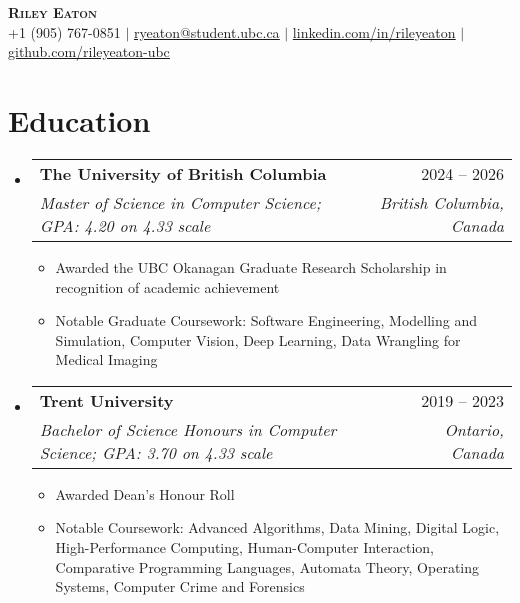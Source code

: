 \documentclass[letterpaper,11.5pt]{article}
\makeatletter
\newcommand{\resumeItem}[1]{
  \item\small{
    {#1 \vspace{-2pt}}
  }
}
\newcommand{\resumeSubheading}[4]{
  \vspace{-2pt}\item
    \begin{tabular*}{0.97\textwidth}[t]{l@{\extracolsep{\fill}}r}
      \textbf{#1} & #2 \\
      \textit{\small#3} & \textit{\small #4} \\
    \end{tabular*}\vspace{-7pt}
}
\newcommand{\resumeSubHeadingListStart}{\begin{itemize}[leftmargin=0.15in, label={}]}
\newcommand{\resumeSubHeadingListEnd}{\end{itemize}}
\newcommand{\resumeItemListStart}{\begin{itemize}}
\newcommand{\resumeItemListEnd}{\end{itemize}\vspace{-5pt}}
\def\iconSpace{0.5pt}
\makeatother
\begin{document}
\begin{center}
    \textbf{\Huge \scshape Riley Eaton} \\ \vspace{1pt}
    \small \faMobile \hspace{\iconSpace} +1 (905) 767-0851 
    $|$ \faEnvelope \hspace{\iconSpace} \href{mailto:ryeaton@student.ubc.ca}{\underline{ryeaton@student.ubc.ca}} 
    $|$ \faLinkedinSquare \hspace{\iconSpace} \href{https://linkedin.com/in/rileyeaton}{\underline{linkedin.com/in/rileyeaton}} 
    $|$ \faGithub \hspace{\iconSpace} \href{https://github.com/rileyeaton-ubc}{\underline{github.com/rileyeaton-ubc}}
\end{center}

\section{Education}
  \resumeSubHeadingListStart
    \resumeSubheading
      {The University of British Columbia}{2024 -- 2026}
      {Master of Science in Computer Science; GPA: 4.20 on 4.33 scale}{British Columbia, Canada}
      \resumeItemListStart
        \resumeItem{Awarded the UBC Okanagan Graduate Research Scholarship in recognition of academic achievement}
        \resumeItem{Notable Graduate Coursework: Software Engineering, Modelling and Simulation, Computer Vision, Deep Learning, Data Wrangling for Medical Imaging}
      \resumeItemListEnd
    \resumeSubheading
      {Trent University}{2019 -- 2023}
      {Bachelor of Science Honours in Computer Science; GPA: 3.70 on 4.33 scale}{Ontario, Canada}
      \resumeItemListStart
        \resumeItem{Awarded Dean's Honour Roll}
        \resumeItem{Notable Coursework: Advanced Algorithms, Data Mining, Digital Logic, High-Performance Computing, Human-Computer Interaction, Comparative Programming Languages, Automata Theory, Operating Systems, Computer Crime and Forensics}
      \resumeItemListEnd
  \resumeSubHeadingListEnd

\end{document}
